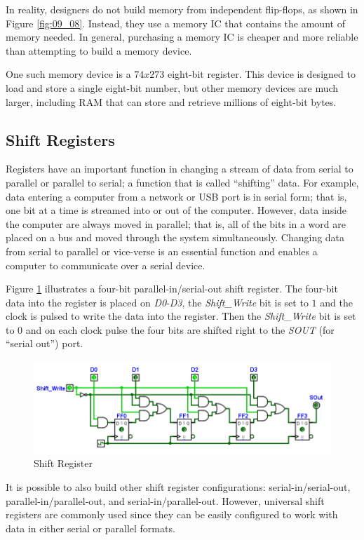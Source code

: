 In reality, designers do not build memory from independent flip-flops, as shown in Figure \ref{fig:09_08}. Instead, they use a memory \ac{IC} that contains the amount of memory needed. In general, purchasing a memory \ac{IC} is cheaper and more reliable than attempting to build a memory device.

One such memory device is a $ 74x273 $ eight-bit register. This device is designed to load and store a single eight-bit number, but other memory devices are much larger, including \ac{RAM} that can store and retrieve millions of eight-bit bytes.

\subsection{Shift Registers}
\label{SL:subsec:shift_registers}

Registers have an important function in changing a stream of data from serial to parallel or parallel to serial; a function that is called ``shifting'' data. For example, data entering a computer from a network or \ac{USB} port is in serial form; that is, one bit at a time is streamed into or out of the computer. However, data inside the computer are always moved in parallel; that is, all of the bits in a word are placed on a bus and moved through the system simultaneously. Changing data from serial to parallel or vice-verse is an essential function and enables a computer to communicate over a serial device.

Figure \ref{fig:09_09} illustrates a four-bit parallel-in/serial-out shift register. The four-bit data into the register is placed on \emph{D0}-\emph{D3}, the \emph{Shift\_Write} bit is set to $ 1 $ and the clock is pulsed to write the data into the register. Then the \emph{Shift\_Write} bit is set to $ 0 $ and on each clock pulse the four bits are shifted right to the \emph{SOUT} (for ``serial out'') port.

\begin{figure}[H]
	\centering
	\includegraphics[width=\maxwidth{.95\linewidth}]{gfx/09_09}
	\caption{Shift Register}
	\label{fig:09_09}
\end{figure}

It is possible to also build other shift register configurations: serial-in/serial-out, parallel-in/parallel-out, and serial-in/parallel-out. However, universal shift registers are commonly used since they can be easily configured to work with data in either serial or parallel formats.

